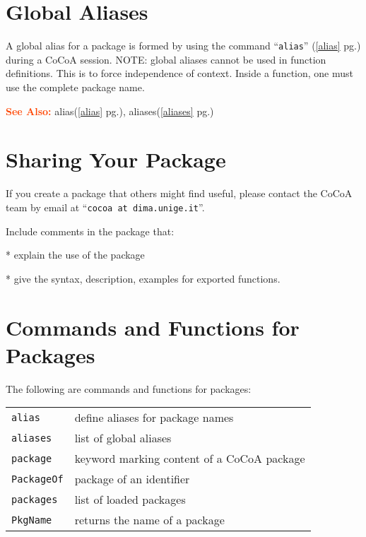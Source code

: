 \documentclass[a4paper]{mybook}
\newcommand\SeeAlso{\par\textcolor{OrangeRed}{\textbf{\large See Also: }}}
\begin{document}
\section{Global Aliases}
\label{Global Aliases}

        
A global alias for a package is formed by using the command ``\verb&alias&'' (\ref{alias} pg.\pageref{alias})
during a CoCoA session.
NOTE: global aliases cannot be used in function definitions.
This is to force independence of context.
Inside a function, one must use the complete package name.

\SeeAlso %
  alias(\ref{alias} pg.\pageref{alias}), 
    aliases(\ref{aliases} pg.\pageref{aliases})

\section{Sharing Your Package}
\label{Sharing Your Package}

        
If you create a package that others might find useful, please contact
the CoCoA team by email at ``\verb&cocoa at dima.unige.it&''.
\par 
Include comments in the package that:
\par 
  * explain the use of the package
\par 
  * give the syntax, description, examples for exported functions.


\section{Commands and Functions for Packages}
\label{Commands and Functions for Packages}

        
The following are commands and functions for packages:

\begin{center}
\begin{longtable}{ll}
   
{\verb~alias~} &
      define aliases for package names\\
   
{\verb~aliases~} &
      list of global aliases\\
   
{\verb~package~} &
      keyword marking content of a CoCoA package\\
   
{\verb~PackageOf~} &
      package of an identifier\\
   
{\verb~packages~} &
      list of loaded packages\\
   
{\verb~PkgName~} &
      returns the name of a package\\
   
\end{longtable}
\end{center}
\end{document}
